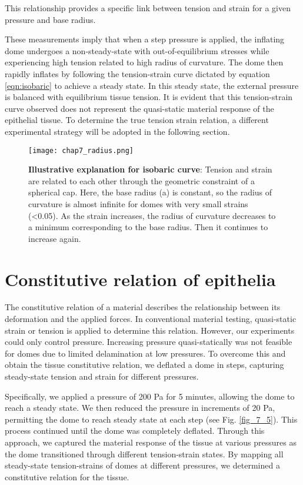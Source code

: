 This relationship provides a specific link between tension and strain for a given pressure and base radius.

These measurements imply that when a step pressure is applied, the inflating dome undergoes a non-steady-state with out-of-equilibrium stresses while experiencing high tension related to high radius of curvature. The dome then rapidly inflates by following the tension-strain curve dictated by equation \ref{eqn:isobaric} to achieve a steady state. In this steady state, the external pressure is balanced with equilibrium tissue tension. It is evident that this tension-strain curve observed does not represent the quasi-static material response of the epithelial tissue. To determine the true tension strain relation, a different experimental strategy will be adopted in the following section.

\begin{figure}
	\centering
	\texttt{[image: chap7\_radius.png]}
	\caption{\label{fig_7_4} \textbf{Illustrative explanation for isobaric curve}: Tension and strain are related to each other through the geometric constraint of a spherical cap. Here, the base radius (a) is constant, so the radius of curvature is almost infinite for domes with very small strains (<0.05). As the strain increases, the radius of curvature decreases to a minimum corresponding to the base radius. Then it continues to increase again.	
	}
\end{figure}

\hypertarget{constitutive-relation-of-epithelia}{%
	\section{Constitutive relation of
		epithelia}\label{constitutive-relation-of-epithelia}}

The constitutive relation of a material describes the relationship between its deformation and the applied forces. In conventional material testing, quasi-static strain or tension is applied to determine this relation. However, our experiments could only control pressure. Increasing pressure quasi-statically was not feasible for domes due to limited delamination at low pressures. To overcome this and obtain the tissue constitutive relation, we deflated a dome in steps, capturing steady-state tension and strain for different pressures.

Specifically, we applied a pressure of 200 \unit{\pascal} for 5 minutes, allowing the dome to reach a steady state. We then reduced the pressure in increments of 20 \unit{\pascal}, permitting the dome to reach steady state at each step (see Fig. \ref{fig_7_5}). This process continued until the dome was completely deflated. Through this approach, we captured the material response of the tissue at various pressures as the dome transitioned through different tension-strain states. By mapping all steady-state tension-strains of domes at different pressures, we determined a constitutive relation for the tissue.

